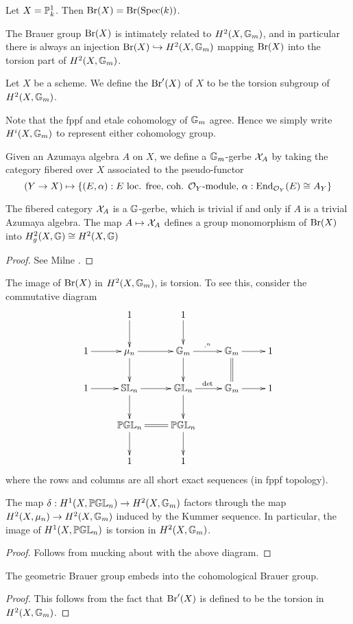 \begin{ex}
Let $X = \mathbb{P}^1_k$.  Then $\textnormal{Br}(X) = \textnormal{Br}(\textnormal{Spec}(k))$.
\end{ex}

The Brauer group $\textnormal{Br}(X)$ is intimately related to $H^2(X,\mathbb{G}_m)$, and in particular there is always an injection $\textnormal{Br}(X)\hookrightarrow H^2(X,\mathbb{G}_m)$ mapping $\textnormal{Br}(X)$ into the torsion part of $H^2(X,\mathbb{G}_m)$.
\begin{defn}
Let $X$ be a scheme.  We define the  $\textnormal{Br}'(X)$ of $X$ to be the torsion subgroup of $H^2(X,\mathbb{G}_m)$.
\end{defn}

\begin{remk}
Note that the fppf and etale cohomology of $\mathbb{G}_m$ agree.  Hence we simply write $H^i(X,\mathbb{G}_m)$ to represent either cohomology group.
\end{remk}

Given an Azumaya algebra $A$ on $X$, we define a $\mathbb{G}_m$-gerbe $\mathcal{X}_A$ by taking the category fibered over $X$ associated to the pseudo-functor
$$(Y\rightarrow X)\mapsto \{(E,\alpha):\text{$E$ loc. free, coh. $\mathcal{O}_Y$-module, $\alpha: \textnormal{End}_{\mathcal{O}_Y}(E)\cong A_Y$}\}$$
\begin{lem}
The fibered category $\mathcal{X}_A$ is a $\mathbb{G}$-gerbe, which is trivial if and only if $A$ is a trivial Azumaya algebra.  The map $A\mapsto \mathcal{X}_A$ defines a group monomorphism of $\textnormal{Br}(X)$ into $H^2_g(X,\mathbb{G})\cong H^2(X,\mathbb{G})$
\end{lem}
\begin{proof}
See Milne \cite{milne1980etale}.
\end{proof}

The image of $\textnormal{Br}(X)$ in $H^2(X,\mathbb{G}_m)$, is torsion.  To see this, consider the commutative diagram
$$\xymatrix{
& 1\ar[d] & 1\ar[d]\\
1\ar[r] & \mu_n\ar[d]\ar[r] & \bbg_m\ar[d]\ar[r]^{\cdot^n} & \bbg_m\ar@{=}[d]\ar[r] & 1\\
1\ar[r] & \bbsl_n\ar[d]\ar[r] & \bbgl_n\ar[d]\ar[r]^{\det} & \bbg_m\ar[r] & 1\\
& \bbpgl_n\ar[d] \ar@{=}[r]& \bbpgl_n\ar[d]\\
& 1 & 1
}$$
where the rows and columns are all short exact sequences (in fppf topology).
\begin{prop}
The map $\delta: H^1(X,\mathbb{PGL}_n)\rightarrow H^2(X,\mathbb{G}_m)$ factors through the map $H^2(X,\mu_n)\rightarrow H^2(X,\mathbb{G}_m)$ induced by the Kummer sequence.  In particular, the image of $H^1(X,\mathbb{PGL}_n)$ is torsion in $H^2(X,\mathbb{G}_m)$.
\end{prop}
\begin{proof}
Follows from mucking about with the above diagram.
\end{proof}
\begin{cor}
The geometric Brauer group embeds into the cohomological Brauer group.
\end{cor}
\begin{proof}
This follows from the fact that $\textnormal{Br}'(X)$ is defined to be the torsion in $H^2(X,\mathbb{G}_m)$.
\end{proof}

